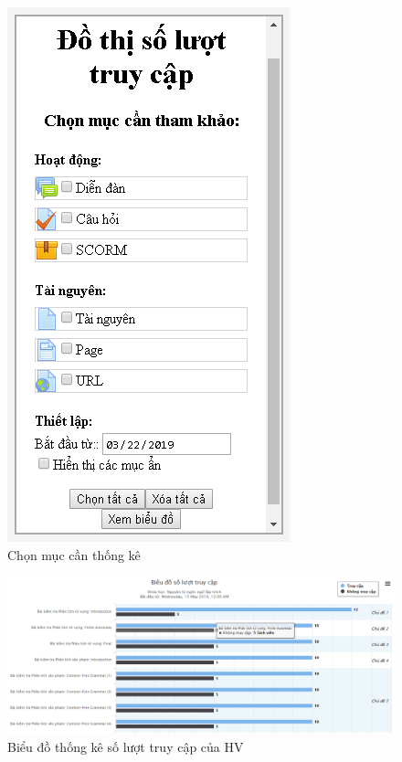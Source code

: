 \begin{center}
	\begin{figure}[htp]
		\begin{center}
			\includegraphics[width=0.6\linewidth]{img/26}
		\end{center}
		\caption{Chọn mục cần thống kê}
		\label{refhinh58}
	\end{figure}
\end{center}

\begin{center}
	\begin{figure}[htp]
		\begin{center}
			\includegraphics[width=1\linewidth]{img/27}
		\end{center}
		\caption{Biểu đồ thống kê số lượt truy cập của HV}
		\label{refhinh59}
	\end{figure}
\end{center}

